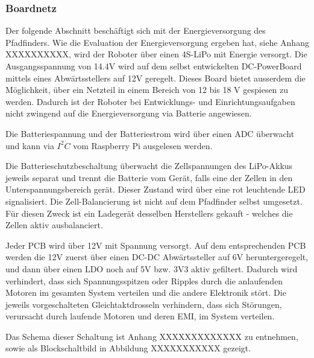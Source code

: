 \documentclass[main.tex]{subfiles} %
\begin{document}

\subsubsection{Boardnetz}

Der folgende Abschnitt beschäftigt sich mit der Energieversorgung des
Pfadfinders. Wie die Evaluation der Energieversorgung ergeben hat, siehe Anhang
XXXXXXXXXX, wird der Roboter über einen 4S-LiPo mit Energie versorgt. Die
Ausgangsspannung von 14.4V wird auf dem selbst entwickelten DC-PowerBoard
mittels eines Abwärtsstellers auf 12V geregelt. Dieses Board bietet ausserdem
die Möglichkeit, über ein Netzteil in einem Bereich von 12 bis 18 V gespiesen
zu werden. Dadurch ist der Roboter bei Entwicklungs- und Einrichtungsaufgaben
nicht zwingend auf die Energieversorgung via Batterie angewiesen.

Die Batteriespannung und der Batteriestrom wird über einen ADC überwacht und
kann via $I^2C$ vom Raspberry Pi ausgelesen werden.

Die Batterieschutzbeschaltung überwacht die Zellspannungen des LiPo-Akkus
jeweils separat und trennt die Batterie vom Gerät, falls eine der Zellen in den
Unterspannungsbereich gerät. Dieser Zustand wird über eine rot leuchtende LED
signalisiert. Die Zell-Balancierung ist nicht auf dem Pfadfinder selbst
umgesetzt. Für diesen Zweck ist ein Ladegerät desselben Herstellers gekauft -
welches die Zellen aktiv ausbalanciert.

Jeder PCB wird über 12V mit Spannung versorgt. Auf dem entsprechenden PCB
werden die 12V zuerst über einen DC-DC Abwärtssteller auf 6V heruntergeregelt,
und dann über einen LDO noch auf 5V bzw. 3V3 aktiv gefiltert. Dadurch wird
verhindert, dass sich Spannungsspitzen oder Ripples durch die anlaufenden
Motoren im gesamten System verteilen und die andere Elektronik stört. Die
jeweils vorgeschalteten Gleichtaktdrosseln verhindern, dass sich Störungen,
verursacht durch laufende Motoren und deren EMI, im System verteilen.

Das Schema dieser Schaltung ist Anhang XXXXXXXXXXXXX zu entnehmen, sowie als
Blockschaltbild in Abbildung XXXXXXXXXXX gezeigt.
\end{document}
